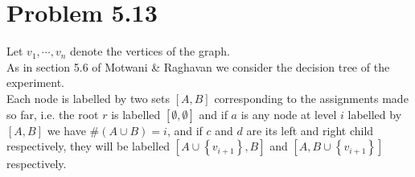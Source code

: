 \section*{Problem 5.13}
Let $v_1,\cdots,v_n$ denote the vertices of the graph. \\
As in section 5.6 of Motwani \& Raghavan we consider the decision tree of the experiment. \\
Each node is labelled by two sets $[A,B]$ corresponding to the assignments made so far,
i.e. the root $r$ is labelled $[\emptyset, \emptyset]$ 
and if $a$ is any node at level $i$ labelled by $[A,B]$ we have $\# (A \cup B)=i$,
and if $c$ and $d$ are its left and right child respectively, they will be labelled
$[A \cup \left\{ v_{i+1} \right\}, B]$ and $[A, B \cup \left\{ v_{i+1} \right\}]$ respectively. \\ \\

